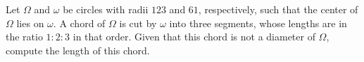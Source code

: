 Let $\Omega$ and $\omega$ be circles with radii $123$ and $61$, respectively, such that the center of $\Omega$ lies on $\omega$. A chord of $\Omega$ is cut by $\omega$ into three segments, whose lengths are in the ratio $1: 2: 3$ in that order. Given that this chord is not a diameter of $\Omega$, compute the length of this chord.